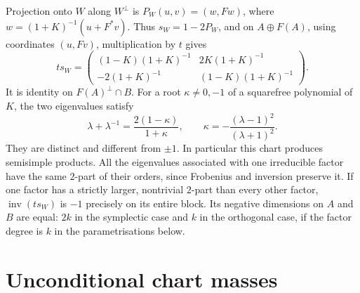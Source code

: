 \documentclass[11pt]{article}
\newcommand{\inv}{\operatorname{inv}}
\begin{document}
Projection onto $W$ along $W^\perp$ is $P_W(u,v)=(w,Fw)$, where $w=(1+K)^{-1}(u+F^*v)$. Thus $s_W=1-2P_W$, and on $A\oplus F(A)$, using coordinates $(u,Fv)$, multiplication by $t$ gives
\begin{equation}\label{productmatrix}
ts_W=\begin{pmatrix}(1-K)(1+K)^{-1}&2K(1+K)^{-1}\\-2(1+K)^{-1}&(1-K)(1+K)^{-1}\end{pmatrix}.
\end{equation}
It is identity on $F(A)^\perp\cap B$. For a root $\kappa\ne0,-1$ of a squarefree polynomial of $K$, the two eigenvalues satisfy
\begin{equation}\label{cayley}
\lambda+\lambda^{-1}=\frac{2(1-\kappa)}{1+\kappa},\qquad
\kappa=-\frac{(\lambda-1)^2}{(\lambda+1)^2}.
\end{equation}
They are distinct and different from $\pm1$. In particular this chart produces semisimple products. All the eigenvalues associated with one irreducible factor have the same $2$-part of their orders, since Frobenius and inversion preserve it. If one factor has a strictly larger, nontrivial $2$-part than every other factor, $\inv(ts_W)$ is $-1$ precisely on its entire block. Its negative dimensions on $A$ and $B$ are equal: $2k$ in the symplectic case and $k$ in the orthogonal case, if the factor degree is $k$ in the parametrisations below.

\section{Unconditional chart masses}\label{masses}
\end{document}
